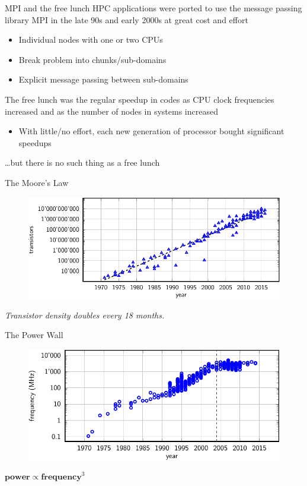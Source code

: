 \documentclass[aspectratio=169,12pt]{beamer}
\begin{document}
\begin{frame}{MPI and the free lunch}
  HPC applications were ported to use the message passing library MPI in the late 90s and early 2000s at great cost and effort
  \begin{itemize}
  \item Individual nodes with one or two CPUs
  \item Break problem into chunks/sub-domains
  \item Explicit message passing between sub-domains
  \end{itemize}

  The free lunch was the regular speedup in codes as CPU clock frequencies increased and as the number of nodes in systems increased
  \begin{itemize}
  \item With little/no effort, each new generation of processor bought significant speedups
  \end{itemize}
  \dots but there is no such thing as a free lunch
\end{frame}

\begin{frame}{The Moore's Law}
  \begin{figure}
    \centering
    \includegraphics[width=.8\textwidth]{transistors_growth}
  \end{figure}
  \small
  \vspace{-.5\baselineskip}\centering
  \emph{Transistor density doubles every 18 months.}
\end{frame}

\begin{frame}{The Power Wall}
  \begin{figure}
    \centering
    \includegraphics[width=.8\textwidth]{freq_scaling}
  \end{figure}
  \vspace{-.5\baselineskip}\centering
  $\mathbf{power} \propto \mathbf{frequency}^3$
\end{frame}
\end{document}
